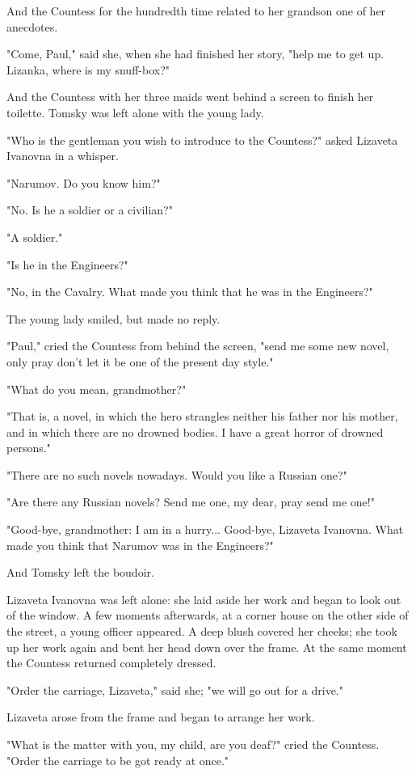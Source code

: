 And the Countess for the hundredth time related to her grandson one of
her anecdotes.

"Come, Paul," said she, when she had finished her story, "help me to
get up. Lizanka, where is my snuff-box?"

And the Countess with her three maids went behind a screen to finish
her toilette. Tomsky was left alone with the young lady.

"Who is the gentleman you wish to introduce to the Countess?" asked
Lizaveta Ivanovna in a whisper.

"Narumov. Do you know him?"

"No. Is he a soldier or a civilian?"

"A soldier."

"Is he in the Engineers?"

"No, in the Cavalry. What made you think that he was in the
Engineers?"

The young lady smiled, but made no reply.

"Paul," cried the Countess from behind the screen, "send me some new
novel, only pray don't let it be one of the present day style."

"What do you mean, grandmother?"

"That is, a novel, in which the hero strangles neither his father nor
his mother, and in which there are no drowned bodies. I have a great
horror of drowned persons."

"There are no such novels nowadays. Would you like a Russian one?"

"Are there any Russian novels? Send me one, my dear, pray send me
one!"

"Good-bye, grandmother: I am in a hurry... Good-bye, Lizaveta
Ivanovna. What made you think that Narumov was in the Engineers?"

And Tomsky left the boudoir.

Lizaveta Ivanovna was left alone: she laid aside her work and began to
look out of the window. A few moments afterwards, at a corner house on
the other side of the street, a young officer appeared. A deep blush
covered her cheeks; she took up her work again and bent her head down
over the frame. At the same moment the Countess returned completely
dressed.

"Order the carriage, Lizaveta," said she; "we will go out for a
drive."

Lizaveta arose from the frame and began to arrange her work.

"What is the matter with you, my child, are you deaf?" cried the
Countess. "Order the carriage to be got ready at once."

